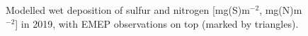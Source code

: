\begin{figure}[H]
 \caption{Modelled wet deposition of sulfur and nitrogen [mg(S)m$^{-2}$, mg(N)m$^{-2}$] in 2019, with EMEP observations on top (marked by triangles).}
\label{wdeps}
\end{figure}

\clearpage
\renewcommand\bibname{References}      %

